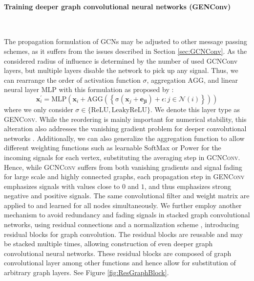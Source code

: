 \documentclass[]{article}
\renewcommand{\cite}{\citep}
\begin{document}
\paragraph{Training deeper graph convolutional neural networks (GENConv)}\mbox{}\\
\label{sec:GENConv}

The propagation formulation of GCNs may be adjusted to other message passing schemes, as it suffers from the issues described in Section \ref{sec:GCNConv}. As the considered radius of influence is determined by the number of used GCNConv layers, but multiple layers disable the network to pick up any signal. Thus, we
can rearrange the order of activation function $\sigma$, aggregation
$\mathrm{AGG}$, and linear neural layer $\mathrm{MLP}$ with this
formulation as proposed by \cite{GENConv2020}:
\begin{equation}
	\mathbf{x}_i^{\prime} = \mathrm{MLP} \left( \mathbf{x}_i +
	\mathrm{AGG} \left( \left\{
	\mathrm{\sigma} \left( \mathbf{x}_j + \mathbf{e_{ji}} \right) +\epsilon
	: j \in \mathcal{N}(i) \right\} \right)
	\right)
\end{equation}
where we only consider
$\sigma \in \{\mathrm{ReLU}, \mathrm{LeakyReLU}\}$. We denote this layer type as \textsc{GENConv}.  While the reordering is
mainly important for numerical stability, this alteration also addresses
the vanishing gradient problem for deeper convolutional networks
\cite{GENConv2020}. Additionally, we can also generalize the
aggregation function to allow different weighting functions such as
learnable $\mathrm{SoftMax}$ or $\mathrm{Power}$ for the incoming
signals for each vertex, substituting the averaging step in
\textsc{GCNConv}. Hence, while \textsc{GCNConv} suffers from both
vanishing gradients and signal fading for large scale and highly
connected graphs, each propagation step in \textsc{GENConv} emphasizes
signals with values close to $0$ and $1$, and thus emphasizes strong negative and positive signals. The same convolutional
filter and weight matrix are applied to and learned for all nodes
simultaneously. 
We further employ another mechanism to avoid redundancy and fading
signals in stacked graph convolutional networks, using residual
connections and a normalization scheme \cite{DeepGCN2019, GENConv2020}, introducing residual blocks for graph convolution. The residual
blocks are reusable and may be stacked multiple times, allowing construction of even deeper graph convolutional neural networks. These residual blocks are composed of graph convolutional layer among other functions and hence allow for substitution of arbitrary graph layers. See Figure \ref{fig:ResGraphBlock}.\\
\end{document}
